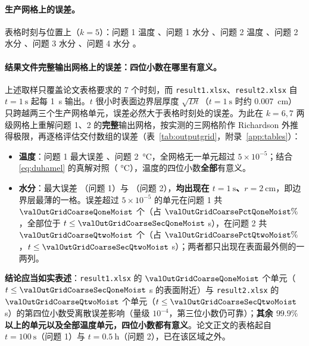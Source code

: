 \paragraph{生产网格上的误差。} 表格时刻与位置上（$k=5$）：问题 1 温度 \sci{\valConvErrQoneTemp}、问题 1 水分 \sci{\valConvErrQoneMoist}、问题 2 温度 \sci{\valConvErrQtwoTemp}、问题 2 水分 \sci{\valConvErrQtwoMoist}、问题 3 水分 \sci{\valConvErrQthreeMoist}、问题 4 水分 \sci{\valConvErrQfourMoist}。


\paragraph{结果文件完整输出网格上的误差：四位小数在哪里有意义。} 上述取样只覆盖论文表格要求的 7 个时刻，而 \nolinkurl{result1.xlsx}、\nolinkurl{result2.xlsx} 自 $t=\SI{1}{\second}$ 起每 \SI{1}{\second} 输出。$t$ 很小时表面边界层厚度 $\sqrt{Dt}$（$t=\SI{1}{\second}$ 时约 \SI{0.007}{\centi\meter}）只跨越两三个生产网格单元，误差必然大于表格时刻处的误差。为此在 $k=6,7$ 两级网格上重解问题 1、2 的\textbf{完整}输出网格，按实测的三网格阶作 Richardson 外推得极限，再逐格评估交付数组的误差（表~\ref{tab:outputgrid}，附录~\ref{app:tables}）：
\begin{itemize}[leftmargin=*,itemsep=0.15em,topsep=0.2em]
  \item \textbf{温度}：问题 1 最大误差 \sci{\valOutGridErrQoneTemp}、问题 2 \sci{\valOutGridErrQtwoTemp}\,\si{\celsius}，全网格无一单元超过 $5\times10^{-5}$；结合\eqref{eq:duhamel} 的真解对照（\sci{\valDuhamelErrFull} \si{\celsius}），温度的四位小数\textbf{全部}有意义。
  \item \textbf{水分}：最大误差 \sci{\valOutGridErrQoneMoist}（问题 1）与 \sci{\valOutGridErrQtwoMoist}（问题 2），\textbf{均出现在 $t=\SI{1}{\second}$、$r=\SI{2}{\centi\meter}$}，即边界层最薄的一格。误差超过 $5\times10^{-5}$ 的单元在问题 1 共 $\valOutGridCoarseQoneMoist$ 个（占 $\valOutGridCoarsePctQoneMoist\%$，全部位于 $t\le\valOutGridCoarseSecQoneMoist$ \si{\second}），在问题 2 共 $\valOutGridCoarseQtwoMoist$ 个（占 $\valOutGridCoarsePctQtwoMoist\%$，$t\le\valOutGridCoarseSecQtwoMoist$ \si{\second}）；两者都只出现在表面最外侧的一两列。
\end{itemize}
\noindent\textbf{结论应当如实表述}：\nolinkurl{result1.xlsx} 的 $\valOutGridCoarseQoneMoist$ 个单元（$t\le\valOutGridCoarseSecQoneMoist$ \si{\second} 的表面附近）与 \nolinkurl{result2.xlsx} 的 $\valOutGridCoarseQtwoMoist$ 个单元（$t\le\valOutGridCoarseSecQtwoMoist$ \si{\second}）的第四位小数受离散误差影响（量级 $10^{-4}$，第三位小数仍可靠）；\textbf{其余 $99.9\%$ 以上的单元以及全部温度单元，四位小数都有意义}。论文正文的表格起自 $t=\SI{100}{\second}$（问题 1）与 $t=\SI{0.5}{\hour}$（问题 2），已在该区域之外。

